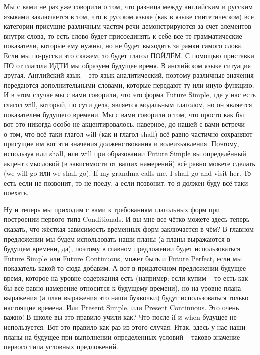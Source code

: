 \documentclass[main.tex]{subfiles}
\begin{document}
Мы с вами не раз уже говорили о том, что разница между английским и русским языками заключается в том, что в русском языке (как в языке синтетическом) все категории присущие различным частям речи демонстрируются за счет элементов внутри слова, то есть слово будет присоединять к себе все те грамматические показатели, которые ему нужны, но не будет выходить за рамки самого слова.
Если мы по-русски это скажем, то будет глагол ПОЙДЁМ.
С помощью приставки ПО от глагола ИДТИ мы образуем будущее время.
В английском языке ситуация другая.
Английский язык -- это язык аналитический, поэтому различные значения передаются дополнительными словами, которые передают ту или иную функцию.
И в этом случае мы с вами говорили, что это форма Future Simple, где у нас есть глагол will, который, по сути дела, является модальным глаголом, но он является показателем будущего времени.
Мы с вами говорили о том, что просто как бы вот это никогда особо не акцентировалось, наверное, до нашей с вами встречи -- о том, что всё-таки глагол will (как и глагол shall) всё равно частично сохраняют присущие им вот эти значения долженствования и волеизъявления.
Поэтому, используя или shall, или will при образовании Future Simple вы определённый акцент смысловой (в зависимости от ваших намерений) всё равно можете сделать (we will go или we shall go).
If my grandma calls me, I shall go and visit her.
То есть если не позвонит, то не поеду, а если позвонит, то я должен буду всё-таки поехать.

Ну и теперь мы приходим с вами к требованиям глагольных форм при построении первого типа Conditionals.
И вы мне все чётко можете здесь теперь сказать, что жёсткая зависимость временных форм заключается в чём?
В главном предложении мы будем использовать наши планы (а планы выражаются в будущем времени, да), поэтому в главном предложении будет использоваться Future Simple или Future Continuous, может быть и Future Perfect, если мы показатель какой-то сюда добавим.
А вот в придаточном предложении будущее время, которое на уровне содержания есть (например: если купим -- то есть как бы всё равно намерение относится к будущему времени), но на уровне плана выражения (а план выражения это наши буквочки) будут использоваться только настоящие времена.
Или Present Simple, или Present Continuous.
Это очень важно!
В школе вы это правило учили как?
Что после if и when будущее не используется.
Вот это правило как раз из этого случая.
Итак, здесь у нас наши планы на будущее при выполнении определенных условий -- таково значение первого типа условных предложений.
\end{document}
